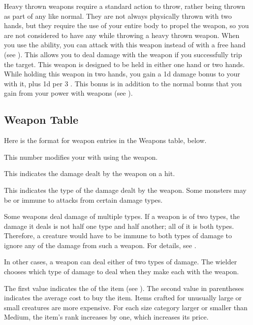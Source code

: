         Heavy thrown weapons require a standard action to throw, rather being thrown as part of any  like normal.
        They are not always physically thrown with two hands, but they require the use of your entire body to propel the weapon, so you are not considered to have any  while throwing a heavy thrown weapon.
         When you use the  ability, you can attack with this weapon instead of with a free hand (see ).
        This allows you to deal damage with the weapon if you successfully trip the target.
         This weapon is designed to be held in either one hand or two hands.
        While holding this weapon in two hands, you gain a \plus1d damage bonus to your  with it, plus \plus1d per 3 .
        This bonus is in addition to the normal bonus that you gain from your power with weapons (see ).

    \subsection{Weapon Table}
        Here is the format for weapon entries in the Weapons table, below.

         This number modifies your  with  using the weapon.

         This  indicates the damage dealt by the weapon on a hit.

         This indicates the type of the damage dealt by the weapon.
        Some monsters may be  or immune to attacks from certain damage types.

        Some weapons deal damage of multiple types. If a weapon is of two types, the damage it deals is not half one type and half another; all of it is both types.
        Therefore, a creature would have to be immune to both types of damage to ignore any of the damage from such a weapon.
        For details, see .

        In other cases, a weapon can deal either of two types of damage.
        The wielder chooses which type of damage to deal when they make each  with the weapon.

         The first value indicates the  of the item (see ).
        The second value in parentheses indicates the average cost to buy the item.
        Items crafted for unusually large or small creatures are more expensive.
        For each size category larger or smaller than Medium, the item's rank increases by one, which increases its price.

